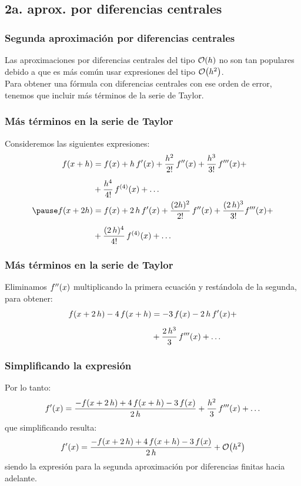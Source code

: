 \documentclass[12pt]{beamer}
\begin{document}
\subsection{2a. aprox. por diferencias centrales}

\begin{frame}
\frametitle{Segunda aproximación por diferencias centrales}
Las aproximaciones por diferencias centrales del tipo $\order{h}$ no son tan populares debido a que es más común usar expresiones del tipo $\order{h^{2}}$.
\\
\bigskip
\pause
Para obtener una fórmula con diferencias centrales con ese orden de error, tenemos que incluir más términos de la serie de Taylor.
\end{frame}
\begin{frame}
\frametitle{Más términos en la serie de Taylor}
Consideremos las siguientes expresiones:
\pause
\begin{eqnarray*}
\begin{aligned}
f (x + h) &= f (x) + h \, \pderivada{f} (x) + \dfrac{h^{2}}{2!} \, \sderivada{f} (x) + \dfrac{h^{3}}{3!} \, \tderivada{f} (x) + \\[0.5em]
&+ \dfrac{h^{4}}{4!} \, f^{(4)} (x) + \ldots \\ \pause
f (x + 2 h) &= f (x) + 2 \, h \, \pderivada{f} (x) + \dfrac{(2 h)^{2}}{2!} \, \sderivada{f} (x) + \dfrac{(2 \, h)^{3}}{3!} \tderivada{f} (x) + \\[0.5em]
&+ \dfrac{(2 \, h)^{4}}{4!} \, f^{(4)}(x) + \ldots
\end{aligned}
\end{eqnarray*}
\end{frame}
\begin{frame}
\frametitle{Más términos en la serie de Taylor}
Eliminamos ${f}^{\prime \prime} (x)$ multiplicando la primera ecuación y restándola de la segunda, para obtener:
\pause
\begin{align*}
f (x + 2 \, h) - 4 \, f (x + h) &= -3 \, f (x) - 2 \, h \, {f}^{\prime} (x) + \\[0.5em]
&+ \dfrac{2 \, h^{3}}{3} \, {f}^{\prime \prime \prime} (x) + \ldots
\end{align*}
\end{frame}
\begin{frame}
\frametitle{Simplificando la expresión}
Por lo tanto:
\pause
\begin{align*}
{f}^{\prime} (x) = \dfrac{-f (x + 2 \, h) + 4 \, f(x + h) - 3 \, f (x)}{2 \, h} + \dfrac{h^{2}}{3} \, {f}^{\prime \prime \prime} (x) + \ldots
\end{align*}
que simplificando resulta:
\pause
\begin{align*}
\pderivada{f} (x) = \dfrac{- f (x + 2 \, h) + 4 \, f (x + h) - 3 \, f (x)}{2 \, h} + \order{h^{2}}
\end{align*}
siendo la expresión para la \textcolor{byzantine}{segunda aproximación por diferencias finitas hacia adelante}.
\end{frame}
\end{document}
